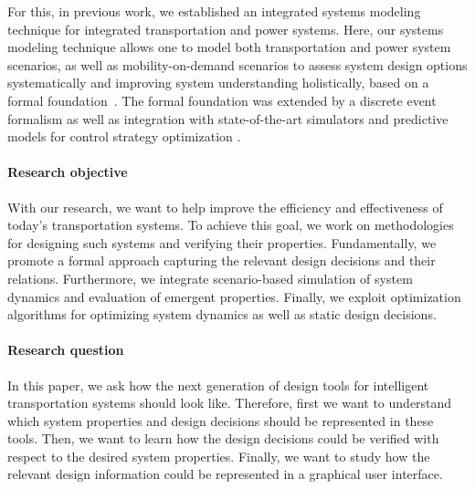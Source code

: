 \documentclass[10pt,twocolumn]{article}
\begin{document}


For this, in previous work, we established an integrated systems modeling technique for integrated transportation and power systems. Here, our systems modeling technique allows one to model both transportation and power system scenarios, as well as mobility-on-demand scenarios to assess system design options systematically and improving system understanding holistically, based on a formal foundation~\cite{ascher_hackenberg_2014,ascher_hackenberg_2015,ascher_hackenberg_2016,ascher_hackenberg_2017}. The formal foundation was extended by a discrete event formalism \cite{ascher2023discrete} as well as integration with state-of-the-art simulators and predictive models for control strategy optimization \cite{ascher_hackenberg_albayrak_2023}.

\paragraph{Research objective}

With our research, we want to help improve the efficiency and effectiveness of today's transportation systems.
To achieve this goal, we work on methodologies for designing such systems and verifying their properties.
Fundamentally, we promote a formal approach capturing the relevant design decisions and their relations.
Furthermore, we integrate scenario-based simulation of system dynamics and evaluation of emergent properties.
Finally, we exploit optimization algorithms for optimizing system dynamics as well as static design decisions.

\paragraph{Research question}

In this paper, we ask how the next generation of design tools for intelligent transportation systems should look like.
Therefore, first we want to understand which system properties and design decisions should be represented in these tools.
Then, we want to learn how the design decisions could be verified with respect to the desired system properties.
Finally, we want to study how the relevant design information could be represented in a graphical user interface.
\end{document}
